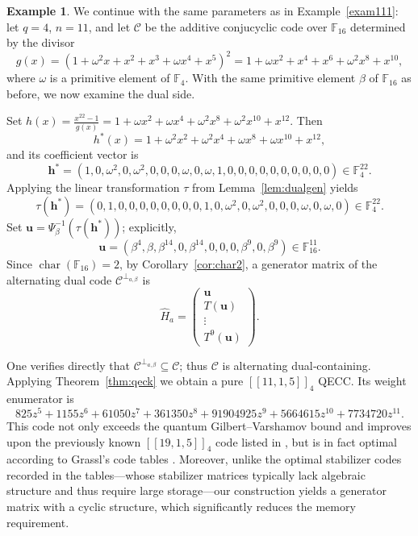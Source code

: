 \documentclass{aims}
\numberwithin{equation}{section}
\theoremstyle{definition}
\newtheorem{example}[theorem]{Example}
\newcommand{\F}{\mathbb{F}}
\newcommand{\charac}{\operatorname{char}}
\begin{document}
\begin{example}\label{ex:dual}
	We continue with the same parameters as in Example~\ref{exam111}: let \(q = 4\), \(n = 11\), and let \(\mathcal{C}\) be the additive conjucyclic code over \(\F_{16}\) determined by the divisor
	\[
	g(x) = (1+\omega^2 x + x^2 + x^3 +\omega x^4 + x^5)^2 = 1+\omega x^2 + x^4 + x^6 +\omega^2 x^8 + x^{10},
	\]
	where \(\omega\) is a primitive element of \(\F_4\). With the same primitive element \(\beta\) of \(\F_{16}\) as before, we now examine the dual side.
	
	Set \(h(x) = \frac{x^{22}-1}{g(x)} = 1 + \omega x^{2} + \omega x^{4} + \omega^{2}x^{8} + \omega^{2}x^{10} + x^{12}\). Then
	\[
	h^{*}(x) = 1 + \omega^{2}x^{2} + \omega^{2}x^{4} + \omega x^{8} + \omega x^{10} + x^{12},
	\]
	and its coefficient vector is
	\[
	\pmb{h^*} = (1,0,\omega^{2},0,\omega^{2},0,0,0,\omega,0,\omega,1,0,0,0,0,0,0,0,0,0,0)\in\F_4^{22}.
	\]
	Applying the linear transformation \(\tau\) from Lemma~\ref{lem:dualgen} yields
	\[
	\tau(\pmb{h^*}) = (0,1,0,0,0,0,0,0,0,0,1,0,\omega^{2},0,\omega^{2},0,0,0,\omega,0,\omega,0)\in\F_4^{22}.
	\]
	Set \(\mathbf{u} = \Psi_\beta^{-1}(\tau(\pmb{h^*}))\); explicitly,
	\[
	\mathbf{u} = (\beta^{4},\beta,\beta^{14},0,\beta^{14},0,0,0,\beta^{9},0,\beta^{9})\in\F_{16}^{11}.
	\]
	Since \(\charac(\F_{16})=2\), 
	by Corollary~\ref{cor:char2}, a generator matrix of the alternating dual code \(\mathcal{C}^{\perp_{a,\beta}}\) is
	\[
	\hat{H}_a = \begin{pmatrix}
		\mathbf{u} \\
		T(\mathbf{u}) \\
		\vdots \\
		T^{9}(\mathbf{u})
	\end{pmatrix}.
	\]

	One verifies directly that \(\mathcal{C}^{\perp_{a,\beta}} \subseteq \mathcal{C}\); thus \(\mathcal{C}\) is alternating dual‑containing. Applying Theorem~\ref{thm:qeck} we obtain a pure \([[11,1,5]]_4\) QECC. Its weight enumerator is
	\[
	825z^{5} + 1155z^{6} + 61050z^{7} + 361350z^{8} + 91904925z^{9} + 5664615z^{10} + 7734720z^{11}.
	\]
This code not only exceeds the quantum Gilbert–Varshamov bound \cite{feng2004} and improves upon the previously known \([[19,1,5]]_4\) code listed in \cite{edel}, but is in fact optimal according to Grassl's code tables \cite{Grassl}. Moreover, unlike the optimal stabilizer codes recorded in the tables—whose stabilizer matrices typically lack algebraic structure and thus require large storage—our construction yields a generator matrix with a cyclic structure, which significantly reduces the memory requirement.
\end{example}
\end{document}
